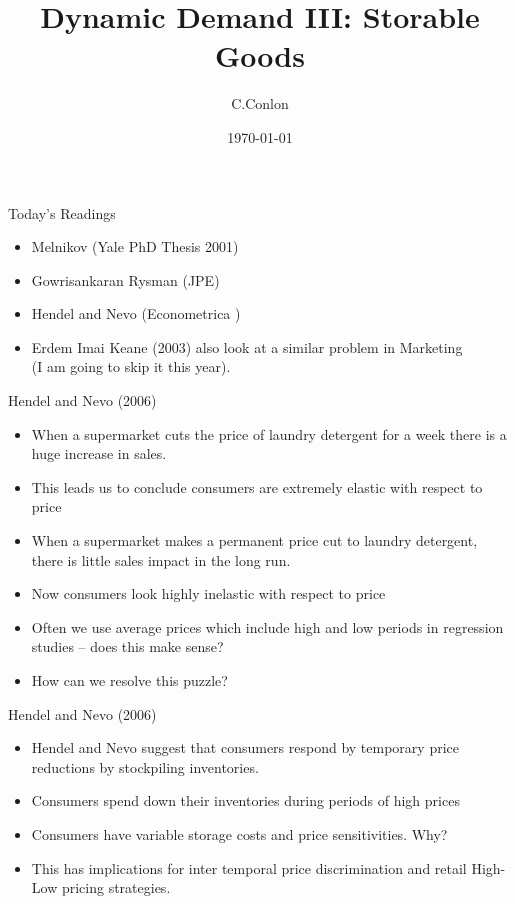 \documentclass[aspectratio=169,11pt]{beamer}
\title [Dynamic Demand III]{Dynamic Demand III:
 Storable Goods }
\author{C.Conlon}
\institute{Grad IO}
\date{\today}
\begin{document}
\maketitle

\begin{frame}{Today's Readings}
\begin{itemize}
\item Melnikov (Yale PhD Thesis 2001)
\item Gowrisankaran Rysman (JPE)
\item \alert{Hendel and Nevo (Econometrica )}
\item Erdem Imai Keane (2003) also look at a similar problem in Marketing\\
(I am going to skip it this year).
\end{itemize}
\end{frame}


\begin{frame}{Hendel and Nevo (2006)}
\begin{itemize}
\item When a supermarket cuts the price of laundry detergent for a week there is a huge increase in sales.
\item This leads us to conclude consumers are extremely elastic with respect to price
\item When a supermarket makes a permanent price cut to laundry detergent, there is little sales impact in the long run.
\item Now consumers look highly inelastic with respect to price
\item Often we use average prices which include high and low periods in regression studies -- does this make sense?
\item How can we resolve this puzzle?
\end{itemize}
\end{frame}

\begin{frame}{Hendel and Nevo (2006)}
\begin{itemize}
\item Hendel and Nevo suggest that consumers respond by temporary price  reductions by stockpiling inventories.
\item Consumers spend down their inventories during periods of high prices
\item Consumers have variable storage costs and price sensitivities. Why?
\item This has implications for inter temporal price discrimination and retail High-Low pricing strategies.
\end{itemize}
\end{frame}
\end{document}

